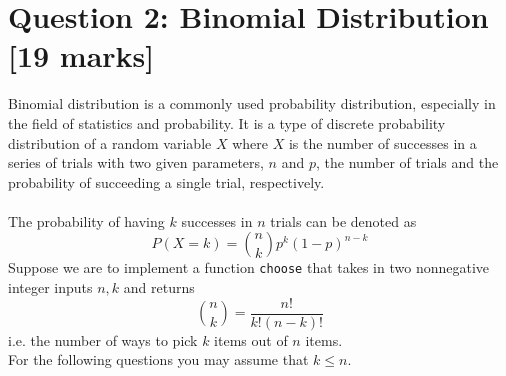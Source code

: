 \newpage
\section{Question 2: Binomial Distribution [19 marks]}
Binomial distribution is a commonly used probability distribution, especially in the field of statistics 
and probability. It is a type of discrete probability distribution of a random variable $X$ where $X$ 
is the number of successes in a series of trials with two given parameters, $n$ and $p$, the 
number of trials and the probability of succeeding a single trial, respectively. \\ \\
The probability of having $k$ successes in $n$ trials can be denoted as
\[P(X = k) = \binom{n}{k}p^k(1-p)^{n-k}\]
Suppose we are to implement a function \colorbox{CornflowerBlue!20}{\texttt{choose}} that takes in two nonnegative integer inputs $n, k$
and returns
\[\binom{n}{k} = \frac{n!}{k!(n-k)!}\]
i.e. the number of ways to pick $k$ items out of $n$ items. \\
For the following questions you may assume that $k \le n$.

